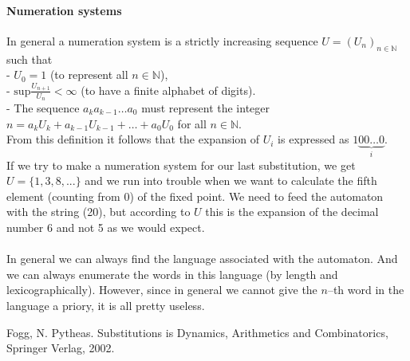 \documentclass{article}
\begin{document}
\paragraph{Numeration systems} In general a numeration system is a strictly
increasing sequence $U = (U_n)_{n \in \mathbb{N}}$ such that\\
- $U_0 = 1$ (to represent all $n \in \mathbb{N}$),\\
- $\mathrm{sup}\frac{U_{n + 1}}{U_n} < \infty$ (to have a finite alphabet of
digits).\\
- The sequence $a_k a_{k - 1} \ldots a_0$ must represent the integer
$n = a_k U_k + a_{k - 1} U_{k - 1} + \ldots + a_0 U_0$ for all 
$n \in \mathbb{N}$.
\\
From this definition it follows that the expansion of $U_i$ is expressed as 
$1\underbrace{00\ldots0}_i$.\\
If we try to make a numeration system for our last substitution, we get
$U = \{1, 3, 8, ...\}$ and we run into trouble when we want to calculate the
fifth element (counting from 0) of the fixed point. We need to feed the 
automaton with the string (20), but according to $U$ this is the expansion of 
the decimal number 6 and not 5 as we would expect.\\
\\
In general we can always find the language associated with the automaton. And
we can always enumerate the words in this language (by length and
lexicographically). However, since in general we cannot give the $n$--th word
in the language a priory, it is all pretty useless.

\begin{thebibliography}{XX}
 Fogg, N. Pytheas. Substitutions is Dynamics, Arithmetics and 
               Combinatorics, Springer Verlag, 2002.
\end{thebibliography}
\end{document}
